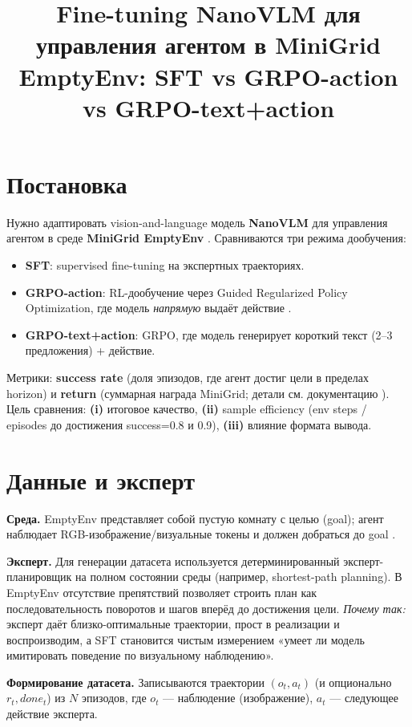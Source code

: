 \documentclass[10pt,a4paper]{article}
\title{\vspace{-0.8em}\textbf{Fine-tuning NanoVLM для управления агентом в MiniGrid EmptyEnv: SFT vs GRPO-action vs GRPO-text+action}\vspace{-0.4em}}
\author{\placeholder{Автор: ФИО / группа}}
\date{\vspace{-0.8em}\placeholder{Дата: YYYY-MM-DD}}
\newcommand{\method}[1]{\textbf{#1}}
\begin{document}
\maketitle
\vspace{-0.8em}

\section{Постановка}
Нужно адаптировать vision-and-language модель \method{NanoVLM} для управления агентом в среде \method{MiniGrid EmptyEnv} \citep{minigrid-emptyenv, nanovlm-repo}.
Сравниваются три режима дообучения:
\begin{itemize}
  \item \method{SFT}: supervised fine-tuning на экспертных траекториях.
  \item \method{GRPO-action}: RL-дообучение через Guided Regularized Policy Optimization, где модель \emph{напрямую} выдаёт действие \citep{grpo}.
  \item \method{GRPO-text+action}: GRPO, где модель генерирует короткий текст (2--3 предложения) + действие.
\end{itemize}

Метрики: \textbf{success rate} (доля эпизодов, где агент достиг цели в пределах horizon) и \textbf{return} (суммарная награда MiniGrid; детали см. документацию \citep{minigrid-emptyenv}). Цель сравнения: \textbf{(i)} итоговое качество, \textbf{(ii)} sample efficiency (env steps / episodes до достижения success=0.8 и 0.9), \textbf{(iii)} влияние формата вывода.

\section{Данные и эксперт}
\textbf{Среда.} EmptyEnv представляет собой пустую комнату с целью (goal); агент наблюдает RGB-изображение/визуальные токены и должен добраться до goal \citep{minigrid-emptyenv}.

\textbf{Эксперт.} Для генерации датасета используется детерминированный эксперт-планировщик на полном состоянии среды (например, shortest-path planning). В EmptyEnv отсутствие препятствий позволяет строить план как последовательность поворотов и шагов вперёд до достижения цели.
\emph{Почему так:} эксперт даёт близко-оптимальные траектории, прост в реализации и воспроизводим, а SFT становится чистым измерением «умеет ли модель имитировать поведение по визуальному наблюдению».

\textbf{Формирование датасета.} Записываются траектории $(o_t, a_t)$ (и опционально $r_t, done_t$) из $N$ эпизодов, где $o_t$ — наблюдение (изображение), $a_t$ — следующее действие эксперта.
\end{document}
